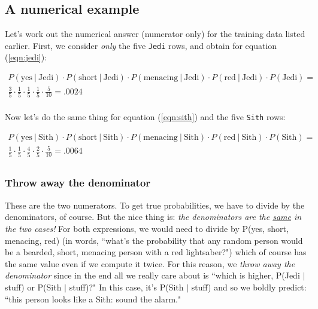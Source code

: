 \documentclass[12pt]{article}
\begin{document}
\subsection{A numerical example}

Let's work out the numerical answer (numerator only) for the training data
listed earlier. First, we consider \textit{only} the five \texttt{Jedi} rows,
and obtain for equation (\ref{eqn:jedi}):

\vspace{-.2in}
\begin{align*}
P(\textrm{yes} \ |\ \textrm{Jedi}) \cdot
P(\textrm{short} \ |\ \textrm{Jedi}) \cdot
P(\textrm{menacing} \ |\ \textrm{Jedi}) \cdot
P(\textrm{red} \ |\ \textrm{Jedi}) \cdot P(\textrm{Jedi}) = \\
\frac{3}{5} \cdot \frac{1}{5} \cdot \frac{1}{5} \cdot \frac{1}{5} \cdot
\frac{5}{10} = .0024\\
\end{align*}

Now let's do the same thing for equation (\ref{eqn:sith}) and the five \texttt{Sith} rows:

\vspace{-.2in}
\begin{align*}
P(\textrm{yes} \ |\ \textrm{Sith}) \cdot
P(\textrm{short} \ |\ \textrm{Sith}) \cdot
P(\textrm{menacing} \ |\ \textrm{Sith}) \cdot
P(\textrm{red} \ |\ \textrm{Sith}) \cdot P(\textrm{Sith}) = \\
\frac{1}{5} \cdot \frac{1}{5} \cdot \frac{4}{5} \cdot \frac{2}{5} \cdot
\frac{5}{10} = .0064\\
\end{align*}

\subsubsection{Throw away the denominator}

These are the two numerators. To get true probabilities, we have to divide by
the denominators, of course. But the nice thing is: \textit{the denominators
are the \underline{same} in the two cases!} For both expressions, we would
need to divide by P(\textrm{yes}, \textrm{short}, \textrm{menacing},
\textrm{red}) (in words, ``what's the probability that any random person would
be a bearded, short, menacing person with a red lightsaber?") which of course
has the same value even if we compute it twice. For this reason, we
\textit{throw away the denominator} since in the end all we really care about
is ``which is higher, P(Jedi $|$ stuff) or P(Sith $|$ stuff)?" In this case,
it's P(Sith $|$ stuff) and so we boldly predict: ``this person looks like a
Sith: sound the alarm."
\end{document}
